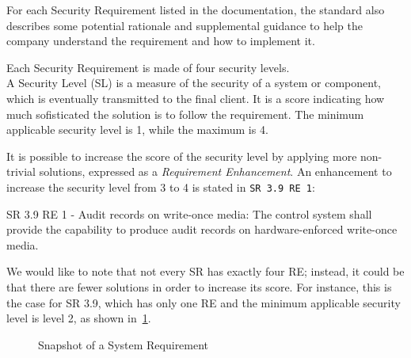 For each Security Requirement listed in the documentation, the standard also describes some potential rationale and supplemental guidance to help the company understand the requirement and how to implement it.

Each Security Requirement is made of four security levels. \\
A Security Level (SL) is a measure of the security of a system or component, which is eventually transmitted to the final client. It is a score indicating how much sofisticated the solution is to follow the requirement. The minimum applicable security level is 1, while the maximum is 4.~\cite{iec-62443-ixon-practical-guide}

It is possible to increase the score of the security level by applying more non-trivial solutions, expressed as a \textit{Requirement Enhancement}. An enhancement to increase the security level from 3 to 4 is stated in \texttt{SR 3.9 RE 1}:
\begin{mdframed}
  SR 3.9 RE 1 - Audit records on write-once media: The control system shall provide the capability to produce audit records on hardware-enforced write-once media.
\end{mdframed}\label{sr:3-3_3-9_re1}

We would like to note that not every SR has exactly four RE; instead, it could be that there are fewer solutions in order to increase its score. For instance, this is the case for SR 3.9, which has only one RE and the minimum applicable security level is level 2, as shown in~\cref{fig:iec62443_3-3_3_9}.

\begin{figure}[ht]
  \centering
  \caption[Snapshot of a System Requirement]{Snapshot of a System Requirement}
  \label{fig:iec62443_3-3_3_9}
\end{figure}

